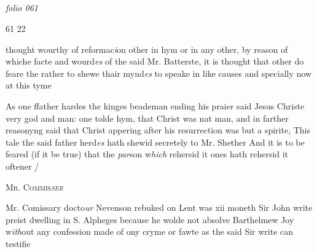\documentclass[12pt, a4paper]{book}
\begin{document}
\dotfill
					  \subsection*{}

\textit{folio 061}
 	
 		
 			
 			
 				\begin{flushright}
 					{\color{Mahogany}61}
 					22
 				\end{flushright}
 			
 			
 				
		\ifthenelse{\isodd{\thepage}}
		{\reversemarginpar}
		{\normalmarginpar}
		thought wourthy of reformac\textit{i}on other in hym or
 in any other, by reason of whiche facte and wourd\textit{es}
 of the said Mr. Batterste, it is thought that other
 do feare the rather to shewe thair mynd\textit{es} to speake in
 like causes and specially now at this tyme
 			
 			
 				
				\marginpar[\vspace{0.5cm}{\textcolor{Gray}{herecie}}]{}
			
 				
				\marginpar[\vspace{0.5cm}{\textcolor{Gray}{n}}]{}
			
 				
		\ifthenelse{\isodd{\thepage}}
		{\reversemarginpar}
		{\normalmarginpar}
		As one ffather hardes the kinges beademan ending
 his praier said Jesus Christe very god and man:
  one tolde hym, that Christ was nat man, and in
 farther reasonyng said that Christ appering after
 his resurrection was but a spirite, This tale the said
  father herd\textit{es} hath shewid secretely to Mr. Shether
 And it is to be feared (if it be true) that the \textit{par}son
 w\textit{hich} rehersid it ones hath rehersid it oftener /
 			
 

               
               	
				\begin{center}  {\scshape Mr. Commis\textit{ser}
                  }  \end{center}
			
               	
               		
			
               		
		\ifthenelse{\isodd{\thepage}}
		{\reversemarginpar}
		{\normalmarginpar}
		Mr. Comissary docto\textit{ur} Nevenson rebuked on Lent
 was xii moneth Sir John write preist dwelling
  in S. Alpheges because he wolde not absolve
               			Barthelmew Joy w\textit{ith}out any confession made of ony
               			cryme or fawte as the said Sir write can testifie
 
\end{document}
